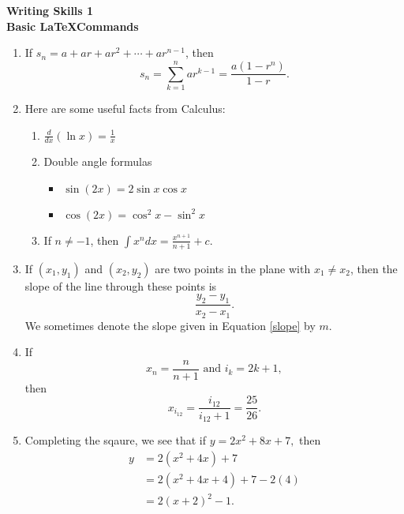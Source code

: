 \documentclass[12pt]{article}
\begin{document}
\begin{center}
\textbf{Writing Skills 1\\
Basic \LaTeX Commands}
\end{center}

\begin{enumerate}
    \item If $s_n = a + ar + ar^2 + \cdots + ar^{n-1}$, then 
        \[s_n = \sum_{k=1}^{n} ar^{k-1} = \frac{a(1-r^n)}{1-r}.\]
    \item Here are some useful facts from Calculus:
        \begin{enumerate}
            \item $\displaystyle \frac{d}{dx}(\ln x) = \frac{1}{x}$
            \item Double angle formulas
                \begin{itemize}
                    \item $\sin(2x) = 2\sin x \cos x$
                    \item $\cos(2x) = \cos^2x - \sin^2x$
                \end{itemize}
            \item If $n \neq -1$, then  $\displaystyle \int x^n dx = \frac{x^{n+1}}{n+1} +c.$
        \end{enumerate}
    \item If $(x_1,y_1)$ and $(x_2,y_2)$ are two points in the plane with $x_1 \neq x_2$, then the slope of the line through these points is
    \begin{equation}\label{slope}
        \frac{y_2 - y_1}{x_2 - x_1}
        .
    \end{equation}
    We sometimes denote the slope given in Equation \eqref{slope} by $m$.
    \item If \[ x_n = \frac{n}{n+1}  \text{ and }  i_k = 2k+1 ,\] then
                \[x_{i_{12}} = \frac{i_{12}}{i_{12}+1}= \frac{25}{26}.\]
    \item Completing the sqaure, we see that if $y = 2x^2 + 8x +7,$ then 
        \begin{align*}
            y &= 2(x^2 +4x)+7 \\
            &= 2(x^2+4x+4)+7-2(4)\\
            &=2(x+2)^2 -1. 
        \end{align*}
        
        
    
\end{enumerate}
\end{document}

